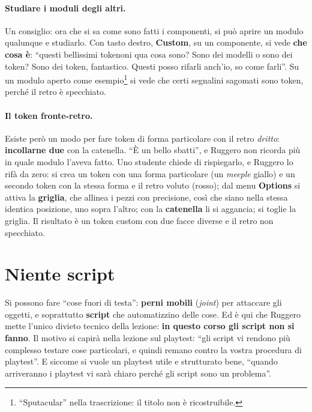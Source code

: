 \paragraph{Studiare i moduli degli altri.} Un consiglio: ora che si sa come sono fatti i
componenti, si può aprire un modulo qualunque e studiarlo. Con tasto destro,
\textbf{Custom}, su un componente, si vede \textbf{che cosa è}: ``questi bellissimi
tokenoni qua cosa sono? Sono dei modelli o sono dei token? Sono dei token, fantastico.
Questi posso rifarli anch'io, so come farli''. Su un modulo aperto come
esempio\footnote{``Sputacular'' nella trascrizione: il titolo non è ricostruibile.} si
vede che certi segnalini sagomati sono token, perché il retro è specchiato.

\paragraph{Il token fronte-retro.} Esiste però un modo per fare token di forma
particolare con il retro \emph{dritto}: \textbf{incollarne due} con la catenella. ``È un
bello sbatti'', e Ruggero non ricorda più in quale modulo l'aveva fatto. Uno studente
chiede di rispiegarlo, e Ruggero lo rifà da zero: si crea un token con una forma
particolare (un \emph{meeple} giallo) e un secondo token con la stessa forma e il retro
voluto (rosso); dal menu \textbf{Options} si attiva la \textbf{griglia}, che allinea i
pezzi con precisione, così che siano nella stessa identica posizione, uno sopra l'altro;
con la \textbf{catenella} li si aggancia; si toglie la griglia. Il risultato è un token
custom con due facce diverse e il retro non specchiato.

\section{Niente script}
\label{a8:sec:script}

Si possono fare ``cose fuori di testa'': \textbf{perni mobili} (\emph{joint}) per
attaccare gli oggetti, e soprattutto \textbf{script} che automatizzino delle cose. Ed è
qui che Ruggero mette l'unico divieto tecnico della lezione: \textbf{in questo corso
gli script non si fanno}. Il motivo si capirà nella lezione sul playtest: ``gli script
vi rendono più complesso testare cose particolari, e quindi remano contro la vostra
procedura di playtest''. E siccome si vuole un playtest utile e strutturato bene,
``quando arriveranno i playtest vi sarà chiaro perché gli script sono un problema''.

